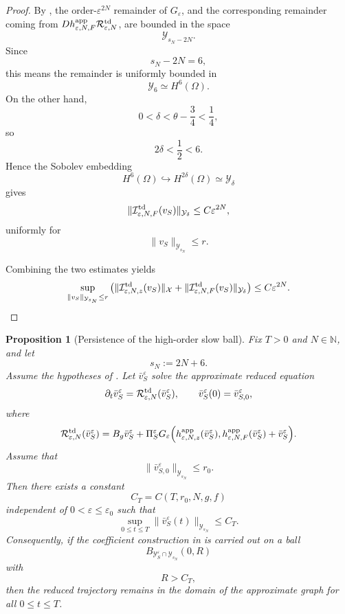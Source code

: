 \documentclass[11pt]{article}
\newtheorem{proposition}[theorem]{Proposition}
\theoremstyle{definition}
\theoremstyle{remark}
\numberwithin{equation}{section}
\begin{document}
\begin{proof}
By , the order-\(\varepsilon^{2N}\) remainder
of \(G_\varepsilon\), and the corresponding remainder coming from
\(Dh_{\varepsilon,N,F}^{\rm app}\mathcal R_{\varepsilon,N}^{\rm td}\), are
bounded in the space
\[
\mathcal Y_{s_N-2N}.
\]
Since
\[
s_N-2N=6,
\]
this means the remainder is uniformly bounded in
\[
\mathcal Y_6\simeq H^6(\Omega).
\]
On the other hand,
\[
0<\delta<\theta-\frac34<\frac14,
\]
so
\[
2\delta<\frac12<6.
\]
Hence the Sobolev embedding
\[
H^6(\Omega)\hookrightarrow H^{2\delta}(\Omega)
\simeq \mathcal Y_\delta
\]
gives
\[
\|\mathcal I_{\varepsilon,N,F}^{\rm td}(v_S)\|_{\mathcal Y_\delta}
\le
C\varepsilon^{2N},
\]
uniformly for
\[
\|v_S\|_{\mathcal Y_{s_N}}\le r.
\]

Combining the two estimates yields
\[
\sup_{\|v_S\|_{\mathcal Y_{s_N}}\le r}
\left(
\|\mathcal I_{\varepsilon,N,z}^{\rm td}(v_S)\|_{\mathcal X}
+
\|\mathcal I_{\varepsilon,N,F}^{\rm td}(v_S)\|_{\mathcal Y_\delta}
\right)
\le
C\varepsilon^{2N}.
\]
\end{proof}

\begin{proposition}[Persistence of the high-order slow ball]
\label{prop:high-order-slow-ball-persistence}
Fix \(T>0\) and \(N\in\mathbb N\), and let
\[
s_N:=2N+6.
\]
Assume the hypotheses of
. 
Let
\(\bar v_S^\varepsilon \)
solve the approximate reduced equation
\[
\partial_t\bar v_S^\varepsilon
=
\mathcal R_{\varepsilon,N}^{\rm td}(\bar v_S^\varepsilon),
\qquad
\bar v_S^\varepsilon(0)=\bar v_{S,0}^\varepsilon,
\]
where
\[
\mathcal R_{\varepsilon,N}^{\rm td}(\bar v_S^\varepsilon)
=
B_g \bar v_S^\varepsilon
+
\Pi_S^\varepsilon
G_\varepsilon\Big(
h_{\varepsilon,N,z}^{\rm app}(\bar v_S^\varepsilon),
h_{\varepsilon,N,F}^{\rm app}(\bar v_S^\varepsilon)+\bar v_S^\varepsilon
\Big).
\]
Assume that
\[
\|\bar v_{S,0}^\varepsilon\|_{\mathcal Y_{s_N}}\le r_0.
\]
Then there exists a constant
\[
C_T=C(T,r_0,N,g,f)
\]
independent of \(0<\varepsilon\le\varepsilon_0\) such that
\[
\sup_{0\le t\le T}
\|\bar v_S^\varepsilon(t)\|_{\mathcal Y_{s_N}}
\le C_T.
\]
Consequently, if the coefficient construction in
 is carried out on a
ball
\[
B_{\mathcal Y_S^\varepsilon\cap\mathcal Y_{s_N}}(0,R)
\]
with
\[
R>C_T,
\]
then the reduced trajectory remains in the domain of the approximate graph for
all \(0\le t\le T\).
\end{proposition}
\end{document}
